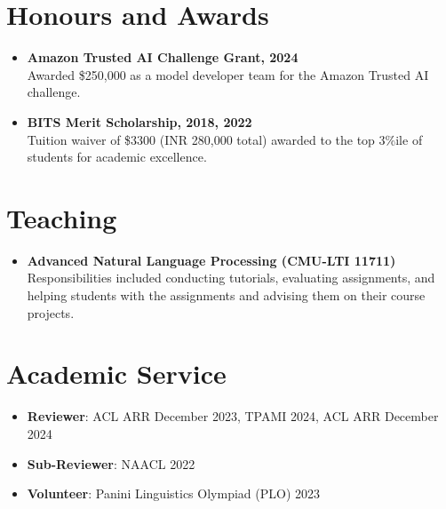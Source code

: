 \documentclass[11pt,letterpaper]{article}
\begin{document}
    \section*{Honours and Awards}
    \begin{itemize}[leftmargin=*,label={},itemsep=4pt]
        \item \textbf{Amazon Trusted AI Challenge Grant, 2024}\\
              Awarded \$250,000 as a model developer team for the Amazon Trusted AI challenge.
                \item \textbf{BITS Merit Scholarship, 2018,
                        2022}\\
              Tuition waiver of \$3300 (INR 280,000 total) awarded to the top 3\%ile of students for
                academic excellence.\end{itemize}
    
    \section*{Teaching}
    \begin{itemize}[leftmargin=*,label={},itemsep=4pt]
        \item \textbf{Advanced Natural Language Processing (CMU-LTI 11711)}\\
            Responsibilities included conducting tutorials, evaluating assignments, and helping students with the
                assignments and advising them on their course projects.
            \\
    \end{itemize}
    
    \section*{Academic Service}
    \begin{itemize}[leftmargin=*,label={},itemsep=4pt]
        \item \textbf{Reviewer}: ACL ARR December 2023, TPAMI 2024, ACL ARR December 2024\
        \item \textbf{Sub-Reviewer}: NAACL 2022\
        \item \textbf{Volunteer}: Panini Linguistics Olympiad (PLO) 2023\
    \end{itemize}
    
\end{document}
